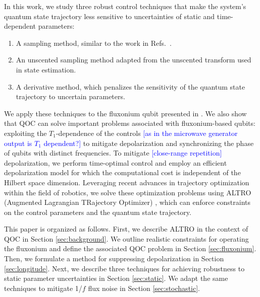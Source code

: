 In this work, we study three robust control techniques that
make the system's quantum state trajectory less sensitive to uncertainties of static and time-dependent parameters:
\begin{enumerate}
\item A sampling method, similar to the work in Refs.~\cite{allen2019robust,
  ball2020software, carvalho2020error, khaneja2005optimal,
  reinhold2019controlling, rembold2020introduction}.
\item An unscented sampling method \cite{howell2020direct, lee2013sigma, thangavel2020robust}
  adapted from the unscented transform \cite{julier2004unscented,
    uhlmann1995dynamic} used in state estimation.
  \item A derivative method, which penalizes the sensitivity of the quantum state trajectory
    to uncertain parameters.
\end{enumerate}
We apply these techniques to the fluxonium qubit presented in \cite{zhang2020universal}.
We also show that QOC can solve important problems associated with
fluxonium-based qubits: exploiting the $T_{1}$-dependence of the controls \textcolor{blue}{[as in the microwave generator output is $T_1$ dependent?]} 
to mitigate depolarization
and synchronizing the phase of qubits with distinct frequencies.
To mitigate \textcolor{blue}{[close-range repetition]} depolarization,
we perform time-optimal control and
employ an efficient depolarization model
for which the computational cost is independent of the
Hilbert space dimension.
Leveraging recent advances in trajectory optimization within the field of robotics, we
solve these optimization problems using ALTRO (Augmented Lagrangian TRajectory Optimizer)
\cite{howell2019altro}, which can enforce constraints on
the control parameters and the quantum state trajectory.

This paper is organized as follows.
First, we describe ALTRO in the context of QOC
in Section \ref{sec:background}.
We outline realistic constraints for operating the fluxonium and
define the associated QOC problem in Section \ref{sec:fluxonium}.
Then, we formulate a method for suppressing depolarization
in Section \ref{sec:longitude}. Next, we describe three techniques for achieving
robustness to static parameter uncertainties in Section \ref{sec:static}. We
adapt the same techniques to mitigate 1/$f$ flux noise
in Section \ref{sec:stochastic}.
